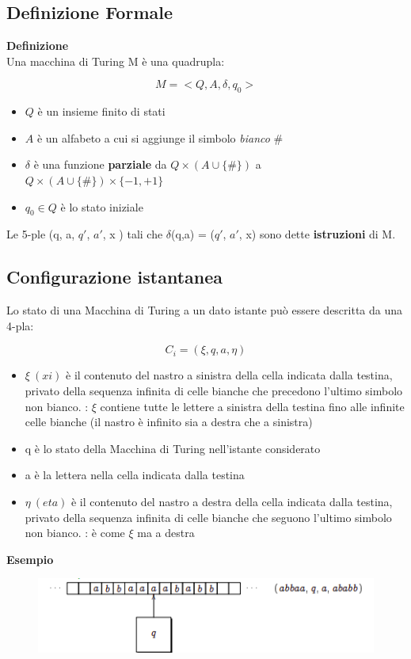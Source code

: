 \subsection{Definizione Formale}
\textbf{Definizione}\\
Una macchina di Turing M è una quadrupla:
\begin{center}
    $$M=<Q,A,\delta,q_0>$$
\end{center}
\begin{itemize}
    \item $Q$ è un insieme finito di stati
    \item $A$ è un alfabeto a cui si aggiunge il simbolo \textit{bianco} \#
    \item $\delta$ è una funzione \textbf{parziale} da $Q \times (A \cup \{\# \})$ a \\
    $Q \times (A \cup \{\# \}) \times \{-1,+1\}$
    \item $q_0 \in Q$ è lo stato iniziale
\end{itemize}
Le 5-ple (q, a, $q'$, $a'$, x ) tali che $\delta$(q,a) = ($q'$, $a'$, x) sono dette \textbf{istruzioni} di M.
\subsection{Configurazione istantanea}
Lo stato di una Macchina di Turing a un dato istante può essere descritta da una 4-pla:
\begin{center}
   $$C_i = (\xi,q,a,\eta)$$ 
\end{center}
\begin{itemize}
    \item $\xi \ (xi)$ è il contenuto del nastro a sinistra della cella indicata dalla testina, privato della sequenza infinita di celle bianche che precedono l’ultimo simbolo non bianco. : $\xi$ contiene tutte le lettere a sinistra della testina fino alle infinite celle bianche (il nastro \`{e} infinito sia a destra che a sinistra)
    
    \item q è lo stato della Macchina di Turing nell’istante considerato
    
    \item a è la lettera nella cella indicata dalla testina
    
    \item $\eta \ (eta)$ è il contenuto del nastro a destra della cella indicata dalla testina, privato della sequenza infinita di celle bianche che seguono l’ultimo simbolo non bianco. : \`{e} come $\xi$ ma a destra
\end{itemize}
\textbf{Esempio}
\vspace{0.2cm}
\begin{figure}[htp]
    \centering
     \includegraphics[scale=0.7]{tesi_stile/img/ese-turing.png}
\end{figure}
\newpage
